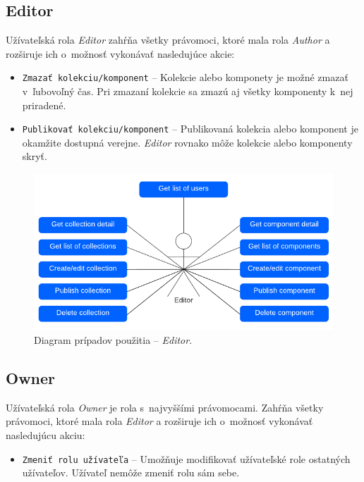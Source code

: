 \subsection{Editor}
Užívateľská rola \emph{Editor} zahŕňa všetky právomoci, ktoré mala rola \emph{Author} a rozširuje ich o~možnosť vykonávať nasledujúce akcie:

\begin{itemize}
	\item \texttt{Zmazať kolekciu/komponent} -- Kolekcie alebo komponety je možné zmazať v~ľubovoľný čas. Pri zmazaní kolekcie sa zmazú aj všetky komponenty k~nej priradené.
	\item \texttt{Publikovať kolekciu/komponent} -- Publikovaná kolekcia alebo komponent je okamžite dostupná verejne. \emph{Editor} rovnako môže kolekcie alebo komponenty skryť.
\end{itemize}

\begin{figure}[h]
	\centering
	\includegraphics[scale=0.9]{obrazky-figures/editor_use_case}
	\caption{Diagram prípadov použitia -- \emph{Editor}.}
\end{figure}

\subsection{Owner}
Užívateľská rola \emph{Owner} je rola s~najvyššími právomocami. Zahŕňa všetky právomoci, ktoré mala rola \emph{Editor} a rozširuje ich o~možnosť vykonávať nasledujúcu akciu:

\begin{itemize}
	\item \texttt{Zmeniť rolu užívateľa} -- Umožňuje modifikovať užívateľské role ostatných užívateľov. Užívateľ nemôže zmeniť rolu sám sebe. 
\end{itemize}


